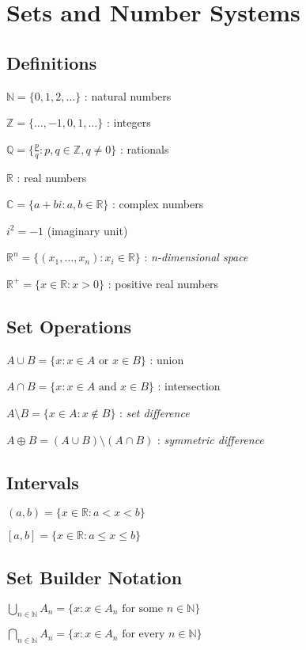 \documentclass[12pt,a4paper]{article}
\begin{document}
\section{Sets and Number Systems}

\subsection{Definitions}

$\mathbb{N} = \{0, 1, 2, \ldots\}$ : natural numbers

$\mathbb{Z} = \{\ldots, -1, 0, 1, \ldots\}$ : integers

$\mathbb{Q} = \{\frac{p}{q} : p, q \in \mathbb{Z}, q \neq 0\}$ : rationals

$\mathbb{R}$ : real numbers

$\mathbb{C} = \{a + bi : a, b \in \mathbb{R}\}$ : complex numbers

$i^2 = -1$ (imaginary unit)

$\mathbb{R}^n = \{(x_1, \ldots, x_n) : x_i \in \mathbb{R}\}$ : \textit{n-dimensional space}

$\mathbb{R}^+ = \{x \in \mathbb{R} : x > 0\}$ : positive real numbers

\subsection{Set Operations}

$A \cup B = \{x : x \in A \text{ or } x \in B\}$ : union

$A \cap B = \{x : x \in A \text{ and } x \in B\}$ : intersection

$A \setminus B = \{x \in A : x \notin B\}$ : \textit{set difference}

$A \oplus B = (A \cup B) \setminus (A \cap B)$ : \textit{symmetric difference}

\subsection{Intervals}

$(a, b) = \{x \in \mathbb{R} : a < x < b\}$

$[a, b] = \{x \in \mathbb{R} : a \leq x \leq b\}$

\subsection{Set Builder Notation}

\begin{center}
$\bigcup_{n \in \mathbb{N}} A_n = \{x : x \in A_n \text{ for some } n \in \mathbb{N}\}$

$\bigcap_{n \in \mathbb{N}} A_n = \{x : x \in A_n \text{ for every } n \in \mathbb{N}\}$
\end{center}
\end{document}

